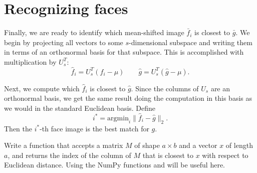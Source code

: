 \section*{Recognizing faces}
Finally, we are ready to identify which mean-shifted image $\bar{f}_i$ is closest to $\bar{g}$. 
We begin by projecting all vectors to some $s$-dimensional subspace and writing them in terms of an orthonormal basis for that subspace. 
This is accomplished with multiplication by $U_s^T$:
\[
\widehat{f}_i = U_s^T(f_i-\mu) \qquad \widehat{g} = U_s^T(\widehat{g}-\mu).
\]

Next, we compute which $\widehat{f}_i$ is closest to $\widehat{g}$. 
Since the columns of $U_s$ are an orthonormal basis, we get the same result doing the computation in this basis as we would in the standard Euclidean basis.
Define
\[
i^* = \text{argmin}_i \|\widehat{f}_i - \widehat{g}\|_2.
\]
Then the $i^*$-th face image is the best match for $g$.

\begin{problem}
\label{prob:nearest}
Write a function  that accepts a matrix $M$ of shape $a \times b$ and a vector $x$
of length $a$, and returns the index of the column of $M$ that is closest to $x$ with respect to Euclidean distance.
Using the NumPy functions  and  will be useful here.
\end{problem}


